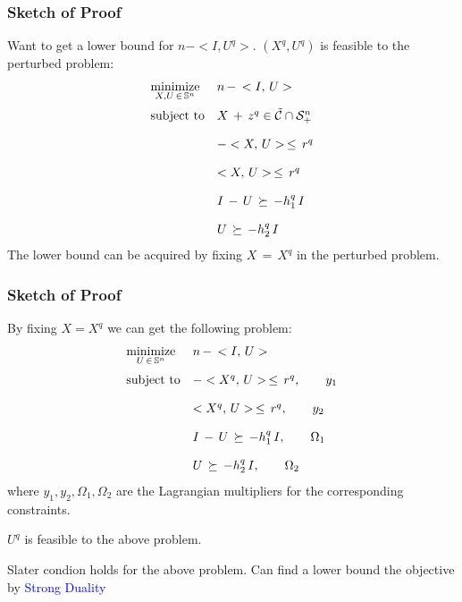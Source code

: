 \documentclass{beamer}
\newcommand{\tblue}{\textcolor{blue}}
\begin{document}
\begin{frame}
\frametitle{Sketch of Proof}
Want to get a lower bound for $n-<I,U^q>$.
$(X^q, U^q)$ is feasible to the perturbed problem:
\begin{equation*} 
\begin{array}{ll}
\displaystyle{
{\operatornamewithlimits{\mbox{minimize}}_{X, U \, \in \, \mathbb{S}^n}}
} &n\,-\,<I,\,U>\\ [0.15in]
\mbox{subject to} & X\,+\,z^q \in \tilde{\mathcal{C}}\cap \mathcal{S}^n_+\\[0.15in]
&- <X,\,U>\,\leq\,r^q\\[0.15in]
& <X,\,U>\,\leq\,r^q\\[0.15in]
& I\,-\,U\,\succeq\,-h_1^q\, I\\[0.15in]
& U\,\succeq\, -h_2^q\, I
\end{array}
\end{equation*}
The lower bound can be acquired by fixing $X\,=\,X^q$ in the perturbed problem.
\end{frame}

\begin{frame}
\frametitle{Sketch of Proof}

By fixing $X=X^q$ we can get the following problem:
\begin{equation*} 
\begin{array}{ll}
\displaystyle{
{\operatornamewithlimits{\mbox{minimize}}_{U \, \in \, \mathbb{S}^n}}
} &n\,-\,<I,\,U>\\ [0.15in]
\mbox{subject to} %
&- <X^q,\,U>\,\leq\,r^q,\qquad y_1\\[0.15in]
& <X^q,\,U>\,\leq\,r^q,\qquad y_2\\[0.15in]
& I\,-\,U\,\succeq\,-h_1^q\, I,\qquad \Omega_1\\[0.15in]
& U\,\succeq\, -h_2^q\, I,\qquad \Omega_2
\end{array}
\end{equation*}
where $y_1, y_2, \Omega_1, \Omega_2$ are the Lagrangian multipliers for the corresponding constraints.
\medskip

$U^q$ is feasible to the above problem.

\medskip
Slater condion holds for the above problem. Can find a lower bound the objective by \tblue{Strong Duality}
\end{frame}
\end{document}
